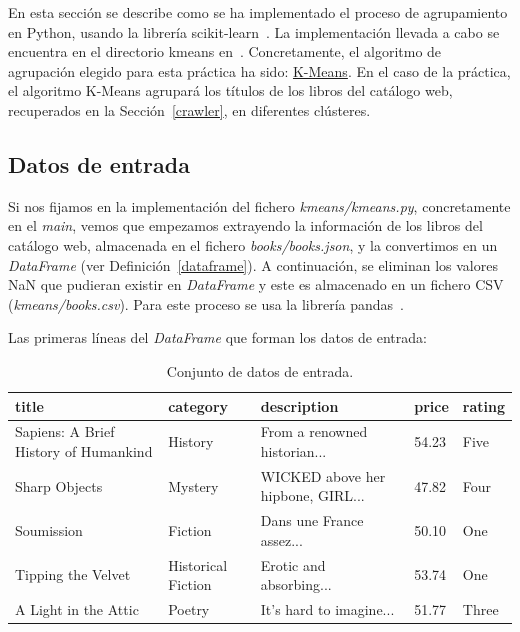\documentclass{uimppracticas}
\begin{document}
En esta sección se describe como se ha implementado el proceso de agrupamiento en Python, usando la librería scikit-learn~\cite{scikit-learn}. La implementación llevada a cabo se encuentra en el directorio kmeans en~\cite{GitHubRepo}. Concretamente, el algoritmo de agrupación elegido para esta práctica ha sido:  \href{https://scikit-learn.org/stable/modules/generated/sklearn.cluster.KMeans.html}{K-Means}. En el caso de la práctica, el algoritmo K-Means agrupará los títulos de los libros del catálogo web, recuperados en la Sección~\ref{crawler}, en diferentes clústeres.

\subsection{Datos de entrada}

Si nos fijamos en la implementación del fichero \textit{kmeans/kmeans.py}, concretamente en el \textit{main}, vemos que empezamos extrayendo la información de los libros del catálogo web, almacenada en el fichero \textit{books/books.json}, y la convertimos en un \textit{DataFrame} (ver Definición~\ref{dataframe}). A continuación, se eliminan los valores NaN que pudieran existir en \textit{DataFrame} y este es almacenado en un fichero CSV (\textit{kmeans/books.csv}). Para este proceso se usa la librería pandas~\cite{jeff_reback_2020_4309786}.

Las primeras líneas del \textit{DataFrame} que forman los datos de entrada:

\begin{table}[h]
	\begin{adjustbox}{width=\columnwidth,center}
		\begin{tabular}{lllll}
			\toprule
			title & category & description & price & rating \\
			\midrule
			Sapiens: A Brief History of Humankind & History & From a renowned historian... & 54.23 & Five \\
			Sharp Objects & Mystery & WICKED above her hipbone, GIRL... & 47.82 & Four \\
			Soumission & Fiction & Dans une France assez... & 50.10 & One \\
			Tipping the Velvet & Historical Fiction & Erotic and absorbing... & 53.74 & One \\
			A Light in the Attic & Poetry & It's hard to imagine... & 51.77 & Three \\
			\bottomrule
		\end{tabular}
	\end{adjustbox}
	\caption{Conjunto de datos de entrada.}
	\label{table1}
\end{table}
\end{document}

